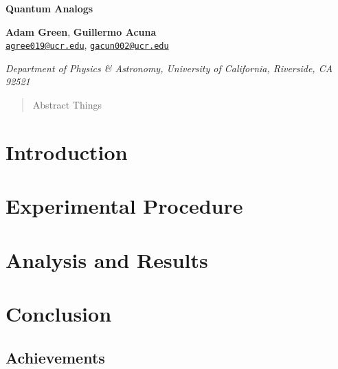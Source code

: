 \documentclass[12pt]{article}
\newcommand{\email}[1]{\href{mailto:#1}{#1}}
\newenvironment{institutions}[1][2em]{\begin{list}{}{\setlength\leftmargin{#1}\setlength\rightmargin{#1}}\item[]}{\end{list}}
\begin{document}
	
\begin{center}

	{\huge \bf Quantum Analogs}
	
	\vspace{0.5cm}
	
	\textbf{Adam Green}, \textbf{Guillermo Acuna}\\
	
	\texttt{\footnotesize \email{agree019@ucr.edu}},
	\texttt{\footnotesize \email{gacun002@ucr.edu}}
	
	\vspace{0.5cm}
	
	
	\begin{institutions}[2.25cm]
		\footnotesize
		{\it 
			Department of Physics \& Astronomy, 
			University of  California, Riverside, 
			{CA} 92521	    
		}    
	\end{institutions}

	\vspace{0.5cm}
	
\end{center}

	\vspace{0.5cm}

\begin{abstract}
Abstract Things	
\end{abstract}
	
	\section{Introduction}
	
	\section{Experimental Procedure}
	
	\section{Analysis and Results}
	
	\section{Conclusion}
	
		\subsection{Achievements}
	
\end{document}
